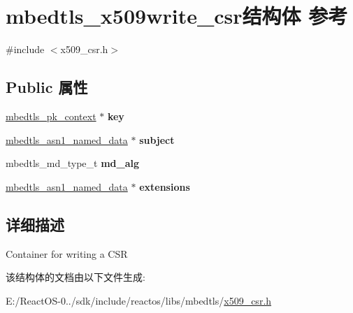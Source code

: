 \hypertarget{structmbedtls__x509write__csr}{}\section{mbedtls\+\_\+x509write\+\_\+csr结构体 参考}
\label{structmbedtls__x509write__csr}


{\ttfamily \#include $<$x509\+\_\+csr.\+h$>$}

\subsection*{Public 属性}
\begin{DoxyCompactItemize}
\item 
\mbox{\label{structmbedtls__x509write__csr_aa11f0d0cf8328a8fac96047e48185e34}} 
\hyperlink{structmbedtls__pk__context}{mbedtls\+\_\+pk\+\_\+context} $\ast$ {\bfseries key}
\item 
\mbox{\label{structmbedtls__x509write__csr_affac2ecd0e1cbb03475e14712b0f1cb7}} 
\hyperlink{structmbedtls__asn1__named__data}{mbedtls\+\_\+asn1\+\_\+named\+\_\+data} $\ast$ {\bfseries subject}
\item 
\mbox{\label{structmbedtls__x509write__csr_a6ab29632c7e1af29696b739ade6ba2ea}} 
mbedtls\+\_\+md\+\_\+type\+\_\+t {\bfseries md\+\_\+alg}
\item 
\mbox{\label{structmbedtls__x509write__csr_ad90011b91ca8e73856511006f93a6a27}} 
\hyperlink{structmbedtls__asn1__named__data}{mbedtls\+\_\+asn1\+\_\+named\+\_\+data} $\ast$ {\bfseries extensions}
\end{DoxyCompactItemize}


\subsection{详细描述}
Container for writing a C\+SR 

该结构体的文档由以下文件生成\+:\begin{DoxyCompactItemize}
\item 
E\+:/\+React\+O\+S-\/0../sdk/include/reactos/libs/mbedtls/\hyperlink{x509__csr_8h}{x509\+\_\+csr.\+h}\end{DoxyCompactItemize}
